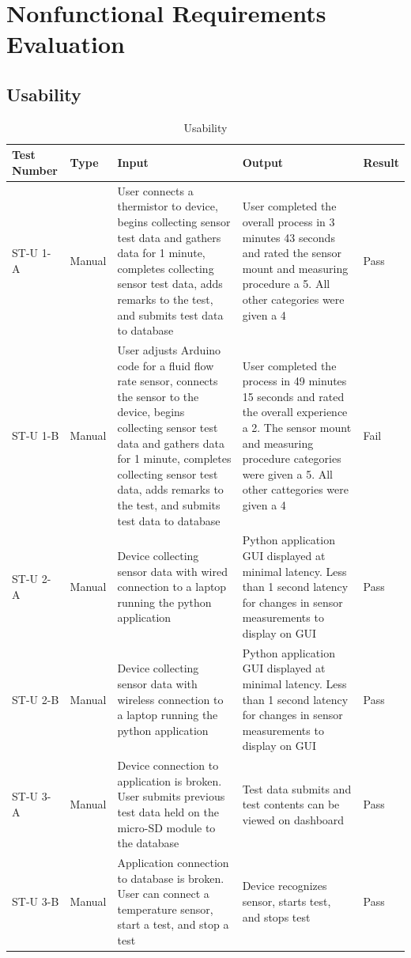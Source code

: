\documentclass[12pt, titlepage]{article}
\begin{document}
\section{Nonfunctional Requirements Evaluation}
\subsection{Usability}
\newpage
\begin{table}[H]
  \begin{tabular}{| p{} | p{}| p{}| p{}| p{}|}
    \hline
    \rowcolor[gray]{0.9}
    Test Number & Type & Input & Output & Result\\
    \hline
    ST-U 1-A & Manual & User connects a thermistor to device, begins collecting sensor test data and gathers data for 1 minute, completes collecting sensor test data, adds remarks to the test, and submits test data to database & User completed the overall process in 3 minutes 43 seconds and rated the sensor mount and measuring procedure a 5. All other categories were given a 4 & Pass \\
    \hline
    ST-U 1-B & Manual & User adjusts Arduino code for a fluid flow rate sensor, connects the sensor to the device, begins collecting sensor test data and gathers data for 1 minute, completes collecting sensor test data, adds remarks to the test, and submits test data to database & User completed the process in 49 minutes 15 seconds and rated the overall experience a 2. The sensor mount and measuring procedure categories were given a 5. All other cattegories were given a 4 & Fail \\
    \hline
    ST-U 2-A & Manual & Device collecting sensor data with wired connection to a laptop running the python application & Python application GUI displayed at minimal latency. Less than 1 second latency for changes in sensor measurements to display on GUI & Pass \\
    \hline
    ST-U 2-B & Manual & Device collecting sensor data with wireless connection to a laptop running the python application & Python application GUI displayed at minimal latency. Less than 1 second latency for changes in sensor measurements to display on GUI & Pass \\
    \hline

    ST-U 3-A & Manual & Device connection to application is broken. User submits previous test data held on the micro-SD module to the database & Test data submits and test contents can be viewed on dashboard & Pass \\
    \hline
    ST-U 3-B & Manual & Application connection to database is broken. User can connect a temperature sensor, start a test, and stop a test & Device recognizes sensor, starts test, and stops test & Pass  \\
    \hline
  \end{tabular}
  \caption{Usability}
  \end{table}
\end{document}
